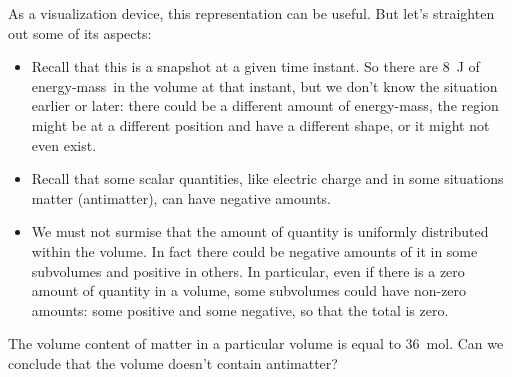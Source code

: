 \documentclass[a4paper,12pt,%
onecolumn,oneside,%
british%
]{memoir}
\renewcommand*{\|}[1][]{\nonscript\:#1\vert\nonscript\:\mathopen{}}
\newcommand*{\energym}{energy-mass}
\begin{document}
As a visualization device, this representation can be useful. But let's straighten out some of its aspects:
\begin{itemize}[para]
\item Recall that this is a snapshot at a given time instant. So there are \qty{8}{J} of \energym\ in the volume at that instant, but we don't know the situation earlier or later: there could be a different amount of \energym, the region might be at a different position and have a different shape, or it might not even exist.

\item Recall that some scalar quantities, like electric charge and in some situations matter (antimatter), can have negative amounts.

\item We must not surmise that the amount of quantity is uniformly distributed within the volume. In fact there could be negative amounts of it in some subvolumes and positive in others. In particular,  even if there is a zero amount of quantity in a volume, some subvolumes could have non-zero amounts: some positive and some negative, so that the total is zero.
\end{itemize}

\bigskip

\begin{exercise}
  The volume content of matter in a particular volume is equal to \qty{36}{mol}. Can we conclude that the volume doesn't contain antimatter?
\end{exercise}
\end{document}
